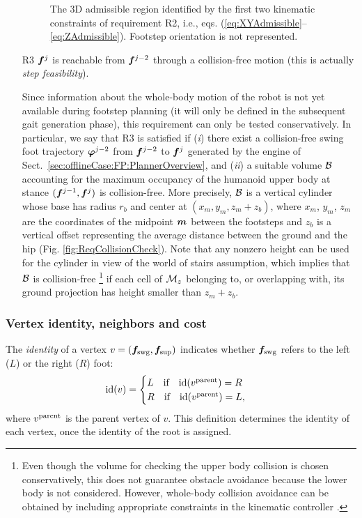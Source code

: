 \begin{itemize}
\begin{figure}[t]
\KinCon
\caption{The 3D admissible region identified by the first two kinematic constraints of requirement R2, i.e., eqs. (\ref{eq:XYAdmissible}-- \ref{eq:ZAdmissible}). Footstep orientation is not represented.}
\label{fig:KinCon}
\end{figure}

\smallskip
\item[R3] ${\bm{f}}^j$ is reachable from ${\bm{f}}^{j-2}$ through a collision-free motion (this is actually {\em step feasibility}).

\smallskip
Since information about the whole-body motion of the robot is not yet available during footstep planning (it will only be defined in the subsequent gait generation phase), this requirement can only be tested conservatively. In particular, we say that R3 is satisfied if ({\em i}) there exist a collision-free swing foot trajectory ${\bm{\varphi}}^{j-2}$ from ${\bm{f}}^{j-2}$ to ${\bm{f}}^{j}$ generated by the engine of Sect.~\ref{sec:offlineCase:FP:PlannerOverview}, and ({\em ii}) a suitable volume ${\cal B}$ accounting for the maximum occupancy of the humanoid upper body at stance $({\bm{f}}^{j-1}, {\bm{f}}^{j})$ is collision-free. More precisely, ${\cal B}$ is a vertical cylinder whose base has radius $r_b$ and center at $(x_m, y_m, z_m + z_b)$, where $x_m$, $y_m$, $z_m$ are the coordinates of the midpoint ${\bm{m}}$ between the footsteps and $z_b$ is a vertical offset representing the average distance between the ground and the hip (Fig. \ref{fig:ReqCollisionCheck}). 
Note that any nonzero height can be used for the cylinder in view of the world of stairs assumption, which implies that ${\cal B}$ is collision-free \footnote{Even though the volume for checking the upper body collision is chosen conservatively, this does not guarantee obstacle avoidance because the lower body is not considered. However, whole-body collision avoidance can be obtained by including appropriate constraints in the kinematic controller \cite{Escande_SoT2014}.} if each cell of ${\cal M}_z$ belonging to, or overlapping with, its ground projection has height smaller than $z_m + z_b$.

\end{itemize}

\medskip

\subsubsection{Vertex identity, neighbors and cost}
\label{sec:offlineCase:FP:CostFunctions}
The {\em identity} of a vertex $v=({\bm{f}}_{\rm swg}, {\bm{f}}_{\rm sup})$ indicates whether  ${\bm{f}}_{\rm swg}$ refers to the left ($L$) or the right ($R$) foot:
\[
{\rm id}(v)=
\begin{cases}
L\quad \mbox{if} \quad{\rm id}(v^{\rm parent}) = R \\
R\quad \mbox{if} \quad{\rm id}(v^{\rm parent}) = L,
\end{cases}
\]
where $v^{\rm parent}$ is the parent vertex of $v$.
This definition determines the identity of each vertex, once the identity of the root is assigned.

